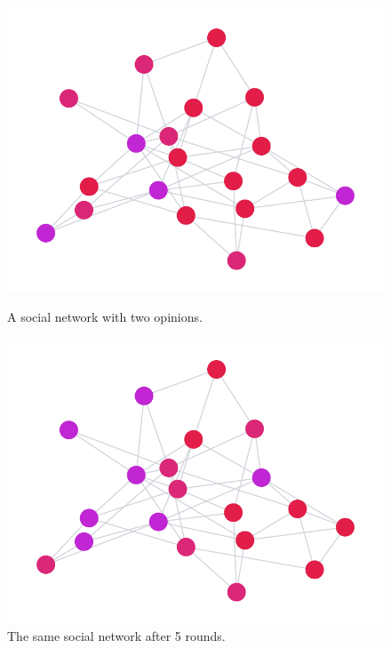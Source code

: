 \documentclass[11pt]{article}
\begin{document}
\begin{figure}[H]
  \begin{minipage}[b]{0.5\linewidth}
    \centering
    \includegraphics[width=\linewidth]{results/01/run-1/snapshot-0}
    \caption{A social network with two opinions.}
  \end{minipage}%
  \begin{minipage}[b]{0.5\linewidth}
    \centering
    \includegraphics[width=\linewidth]{results/01/run-1/snapshot-5}
    \caption{The same social network after 5 rounds.}
  \end{minipage}
\end{figure}

\medskip
\end{document}
